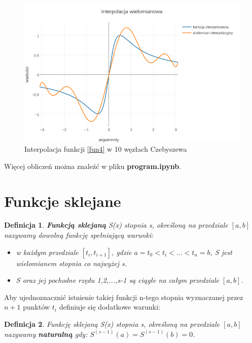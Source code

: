 \documentclass{article}
\newtheorem{defi}{Definicja}
\begin{document}
\begin{figure}[ht]
	\begin{center}
		\includegraphics[width=13cm]{chebyshev_lagrange_d}
	\end{center}
	\caption{Interpolacja funkcji \eqref{fun4} w 10 węzłach Czebyszewa}
	\label{fig:5}
\end{figure}




Więcej obliczeń można znaleźć w pliku \textbf{program.ipynb}.

\section{Funkcje sklejane}


\begin{defi}
	\textbf{Funkcją sklejaną} S(x) stopnia s, określoną na przedziale $[a,b]$ nazywamy dowolną funkcję spełniającą warunki:
	
	\begin{itemize}
		\item w każdym przedziale $[t_i,t_{i+1}]$, gdzie $a = t_0 < t_i <...<t_n = b$, S jest wielomianem stopnia co najwyżej s.
		\item S oraz jej pochodne rzędu 1,2,...,s-1 są ciągłe na całym przedziale $[a,b]$.
	\end{itemize}
\end{defi}

\noindent Aby ujednoznacznić istnienie takiej funkcji n-tego stopnia wyznaczanej przez $n+1$ punktów $t_i$ definiuje się dodatkowe warunki:

\begin{defi}
	Funkcję sklejaną S(x) stopnia s, określoną na przedziale $[a,b]$
	nazywamy \textbf{naturalną} gdy:
	$S^{(s-1)}(a) = S^{(s-1)}(b) = 0$.
\end{defi}
\end{document}
